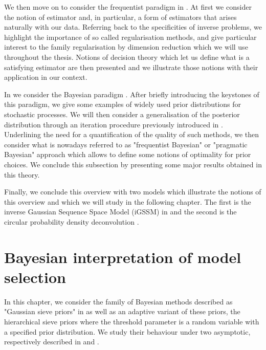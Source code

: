 \documentclass[a4paper,11pt]{book}
\begin{document}
\medskip

We then move on to consider the frequentist paradigm in . 
At first we consider the notion of estimator and, in particular, a form of estimators that arises naturally with our data.
Referring back to the specificities of inverse problems, we highlight the importance of so called regularisation methods, and give particular interest to the family regularisation by dimension reduction which we will use throughout the thesis.
Notions of decision theory which let us define what is a satisfying estimator are then presented and we illustrate those notions with their application in our context.

\medskip

In  we consider the Bayesian paradigm .
After briefly introducing the keystones of this paradigm, we give some examples of widely used prior distributions for stochastic processes.
We will then consider a generalisation of the posterior distribution through an iteration procedure previously introduced in .
Underlining the need for a quantification of the quality of such methods, we then consider what is nowadays referred to as "frequentist Bayesian" or "pragmatic Bayesian" approach which allows to define some notions of optimality for prior choices.
We conclude this subsection by presenting some major results obtained in this theory.

\medskip

Finally, we conclude this overview with two models which illustrate the notions of this overview and which we will study in the following chapter.
The first is the inverse Gaussian Sequence Space Model (iGSSM) in  and the second is the circular probability density deconvolution .








\chapter{Bayesian interpretation of model selection}\label{BAYES}

In this chapter, we consider the family of Bayesian methods described as "Gaussian sieve priors" in  as well as an adaptive variant of these priors, the hierarchical sieve priors where the threshold parameter is a random variable with a specified prior distribution.
We study their behaviour under two asymptotic, respectively described in  and .
\end{document}
